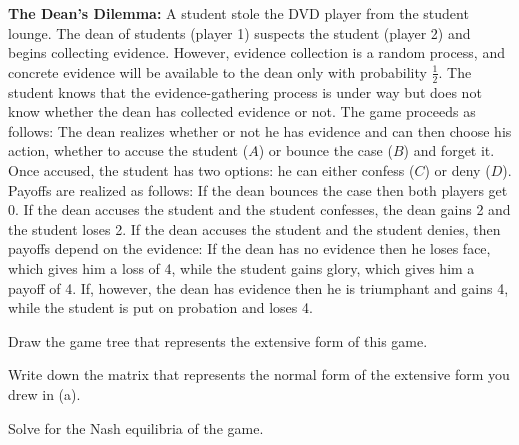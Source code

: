 
\textbf{The Dean's Dilemma:} A student stole the DVD player from the student lounge. The dean
of students (player 1) suspects the student (player 2) and begins collecting evidence. However,
evidence collection is a random process, and concrete evidence will be available to the dean only
with probability $\frac{1}{2}$. The student knows that the evidence-gathering process is under way
but does not know whether the dean has collected evidence or not. The game proceeds as follows: The
dean realizes whether or not he has evidence and can then choose his action, whether to accuse the
student ($A$) or bounce the case ($B$) and forget it. Once accused, the student has two options: he
can either confess ($C$) or deny ($D$). Payoffs are realized as follows: If the dean bounces the case
then both players get 0. If the dean accuses the student and the student confesses, the dean gains
2 and the student loses 2. If the dean accuses the student and the student denies, then payoffs
depend on the evidence: If the dean has no evidence then he loses face, which gives him a loss of
4, while the student gains glory, which gives him a payoff of 4. If, however, the dean has evidence
then he is triumphant and gains 4, while the student is put on probation and loses 4.
\begin{partes}
\item Draw the game tree that represents the extensive form of this game.
\item Write down the matrix that represents the normal form of the extensive form you drew in (a).
\item Solve for the Nash equilibria of the game.
\end{partes}
\resolespaco


